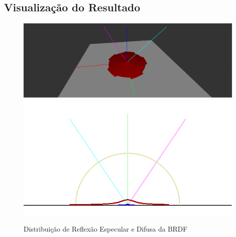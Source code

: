 \subsection{Visualização do Resultado}
\begin{figure}[H]
    \caption{\small{Distribuição de Reflexão Especular e Difusa da BRDF}}\label{fig-minnaert-eqlang}
    \vspace{42px}
  \includegraphics[width=\linewidth]{./Imagens/brdfs/minnaert-3D-plot}
\endminipage\hfill
{}
  \includegraphics[width=\linewidth]{./Imagens/brdfs/minnaert-polar-plot.png}
\endminipage\hfill
\end{figure}

